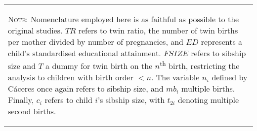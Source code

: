 \documentclass{article}[11pt,subeqn]
\begin{document}
\begin{spacing}{1.25}
\begin{center}
\begin{rotate}{90}
\begin{tabular}{lp{4mm}lll}
\bottomrule 
\multicolumn{5}{p{19.2cm}}{\setstretch{0.9}\begin{footnotesize}\textsc{Note:} Nomenclature employed here is as faithful as possible to the original studies.  $TR$ refers to twin ratio, the number of twin births per mother divided by number of pregnancies, and $ED$ represents a child's standardised educational attainment. $FSIZE$ refers to sibship size and $T$ a dummy for twin birth on the $n$\textsuperscript{th} birth, restricting the analysis to children with birth order $<n$. The variable $n_i$ defined by C\'aceres once again refers to sibship size, and $mb_i$ multiple births. Finally, $c_i$ refers to child $i$'s sibship size, with $t_{2i}$ denoting multiple second births.\end{footnotesize}}\\
\end{tabular}
\end{rotate}
\label{tab:litrev}
\end{center}


\end{spacing}
\end{document}

